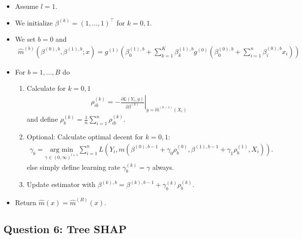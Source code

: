 \documentclass[a4paper,12pt,openany]{book}
\providecommand{\tightlist}{%
 \setlength{\itemsep}{0pt}\setlength{\parskip}{0pt}}
\begin{document}
\begin{itemize}
\tightlist
\item
  Assume \(l=1\).
\item
  We initialize \(\beta^{(k)}=(1,...,1)^\top\) for \(k=0,1\).
\item
  We set \(b=0\) and
  \begin{align*}
    \hat m^{(b)}(\beta^{(0),b},\beta^{(1),b};x)=g^{(1)}\left(\beta^{(1),b}_0 + \sum_{k=1}^{K}\beta_k^{(1),b}g^{(0)}\left(\beta^{(0),b}_0+\sum_{i=1}^n\beta^{(0),b}_ix_i\right)\right)
    \end{align*}
\item
  For \(b=1,...,B\) do

  \begin{enumerate}
  \def\labelenumi{(\alph{enumi})}
  \tightlist
  \item
    Calculate for \(k=0,1\)
    \begin{align*}
    \rho_{ib}^{(k)}=-\left.\frac{\partial L(Y_i,y)}{\partial \beta^{(k)}}\right\vert_{y=\hat m^{(b-1)}(X_i)}
    \end{align*}
    and define
    \(\rho_{b}^{(k)}=\frac{1}{n}\sum_{i=1}^n\rho_{ib}^{(k)}\).
  \item
    Optional: Calculate optimal decent for \(k=0,1\):
    \begin{align*}
    \gamma_{b}=\underset{\gamma \in (0,\infty)^{l+1}}{\text{arg min}}\sum_{i=1}^n L(Y_i,m(\beta^{(0),b-1}+\gamma_0\rho_b^{(0)},\beta^{(1),b-1}+\gamma_1\rho_b^{(1)},X_i)).
    \end{align*}
    else simply define learning rate \(\gamma_b^{(k)}=\gamma\) always.
  \item
    Update estimator with \(\beta^{(k),b}=\beta^{(k),b-1}+\gamma_{b}^{(k)}\rho_b^{(k)}\).
  \end{enumerate}
\item
  Return \(\hat m(x)=\hat m^{(B)}(x)\).
\end{itemize}

\hypertarget{question-6-tree-shap}{%
\subsection{Question 6: Tree SHAP}\label{question-6-tree-shap}}

\newpage
\nocite{*}
{}

\begin{spacing}{1}

\end{spacing}

\newpage
{}
{}
\begin{spacing}{1}
\printindex
\end{spacing}
\end{document}
